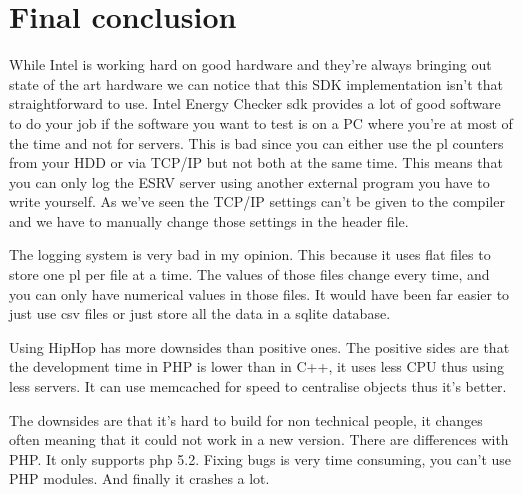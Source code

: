\begin{comment}
	

\begin{wrapfigure}{r}{0.55\textwidth}
 \vspace{-20pt}
  \begin{center}
	\texttt{[image: img/hwcomparison]}
  \end{center}
  \vspace{-30pt}
  \caption{Hardware platform comparison}
  \label{fig:hwcomparison}
\end{wrapfigure}
\end{comment}


\section{Final conclusion}\label{sec:conclusions}
While Intel is working hard on good hardware and they're always bringing out state of the art hardware we can notice that this SDK implementation isn't that straightforward to use.
Intel Energy Checker \gls{sdk} provides a lot of good software to do your job if the software you want to test is on a PC where you're at most of the time and not for servers.
This is bad since you can either use the \gls{pl} counters from your HDD or via TCP/IP but not both at the same time. 
This means that you can only log the ESRV server using another external program you have to write yourself.
As we've seen the TCP/IP settings can't be given to the compiler and we have to manually change those settings in the header file.

The logging system is very bad in my opinion. This because it uses flat files to store one \gls{pl} per file at a time. The values of those files change every time, and you can only have numerical values in those files. It would have been far easier to just use \gls{csv} files  or just store all the data in a \gls{sqlite} database.

Using HipHop has more downsides than positive ones. The positive sides are that the development time in PHP is lower than in C++, it uses less CPU thus using less servers.
It can use memcached for speed to centralise objects thus it's better.

The downsides are that it's hard to build for non technical people, it changes often meaning that it could not work in a new version. There are differences with PHP.
It only supports \gls{php} 5.2. Fixing bugs is very time consuming, you can't use PHP modules. 
And finally it crashes a lot.

